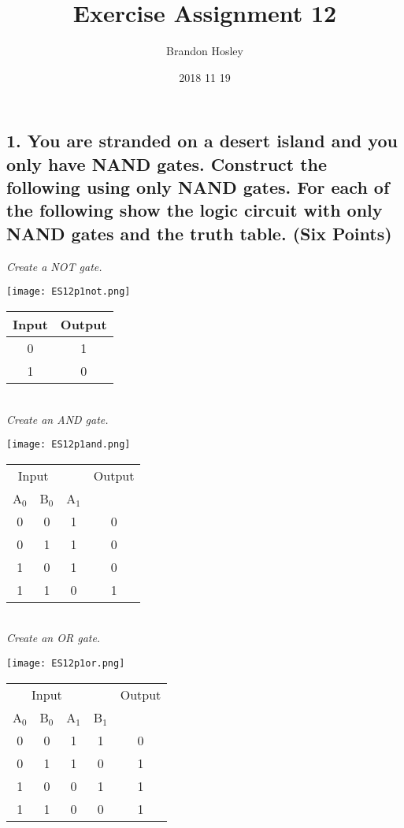 \documentclass[a4paper,man,natbib]{apa6}
\title{Exercise Assignment 12}
\author{Brandon Hosley}
\date{2018 11 19}
\affiliation{Mike Davis}
\begin{document}
	\singlespacing
	\raggedbottom
	\maketitle
\subsection{1. You are stranded on a desert island and you only have NAND gates.  Construct the following using only NAND gates. For each of the following show the logic circuit with only NAND gates and the truth table. (Six Points)}
\emph{Create a NOT gate.}\\
	\begin{minipage}{2.5in}
		\texttt{[image: ES12p1not.png]}
	\end{minipage}
	\begin{minipage}{2.5in}
		\begin{tabular}{ c | c }
			Input & Output \\
			\hline
			0 & 1 \\
			1 & 0 \\
		\end{tabular}
	\end{minipage} ~\\
\emph{Create an AND gate.} \\
	\begin{minipage}{2.5in}
		\texttt{[image: ES12p1and.png]}
	\end{minipage}
	\begin{minipage}{2.5in}
		\begin{tabular}{ c c | c | c }
			\multicolumn{2}{c}{Input} & & Output \\
			A$_{0}$ & B$_{0}$ & A$_{1}$ & \\
			\hline
			0 & 0 & 1 & 0 \\
			0 & 1 & 1 & 0 \\
			1 & 0 & 1 & 0 \\
			1 & 1 & 0 & 1 \\
		\end{tabular}
	\end{minipage} ~\\
\emph{Create an OR gate.} \\
	\begin{minipage}{2.5in}
		\texttt{[image: ES12p1or.png]}
	\end{minipage}
	\begin{minipage}{2.5in}
		\begin{tabular}{ c c | c c | c }
			\multicolumn{3}{c}{Input} & & Output \\
			A$_{0}$ & B$_{0}$ & A$_{1}$ & B$_{1}$ & \\
			\hline
			0 & 0 & 1 & 1 & 0 \\
			0 & 1 & 1 & 0 & 1 \\
			1 & 0 & 0 & 1 & 1 \\
			1 & 1 & 0 & 0 & 1 \\
		\end{tabular}
	\end{minipage} ~\\
\end{document}
